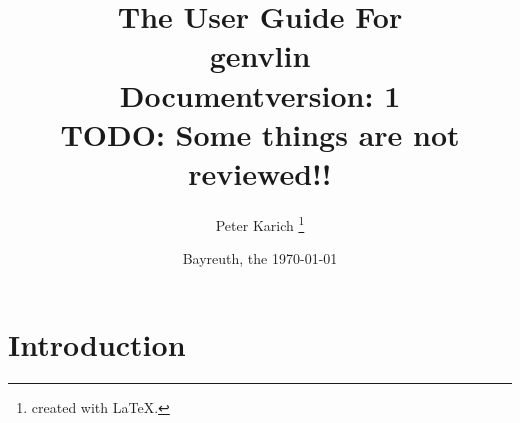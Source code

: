 \documentclass[12pt]{article}
\begin{document}
\addtocounter{footnote}{2}
\pagestyle{empty}
\title{ \bf \LARGE The User Guide For \\[1cm] genvlin\\[1cm] Documentversion: 1\\TODO: Some things are not reviewed!!}
\author{Peter Karich \footnote{created with \LaTeX{}.}}
\date{Bayreuth, the \today}
\maketitle
\newpage
\setcounter{tocdepth}{2}
\tableofcontents
\newpage
\pagestyle{headings}


\section{Introduction}
\end{document}
